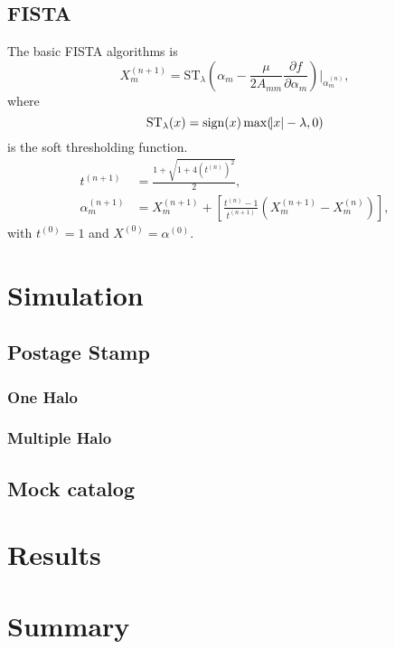 \documentclass[twocolumn]{aastex62}
\begin{document}
\subsection{FISTA}
The basic FISTA algorithms is
\begin{equation}
X^{(n+1)}_m=\mathrm{ST}_{\lambda} (\alpha_m -\frac{\mu}{2A_{mm}} \frac{\partial f}{\partial \alpha_m})|_{\alpha^{(n)}_m} ,
\end{equation}
where
\begin{equation}
\mathrm{ST}_{\lambda} (x) = \mathrm{sign} (x) \max (\abs{x}-\lambda,0)
\end{equation}
is the soft thresholding function.
\begin{equation}
\begin{split}
t^{(n+1)} &= \frac{1+\sqrt{1+4(t^{(n)})^2}}{2},\\
\alpha^{(n+1)}_m&=X^{(n+1)}_m+[\frac{t^{(n)}-1}{t^{(n+1)}}(X^{(n+1)}_m-X^{(n)}_m)],
\end{split}
\end{equation}
with $t^{(0)}=1$ and $X^{(0)}=\alpha^{(0)}$.

\section{Simulation}


\subsection{Postage Stamp}


\subsubsection{One Halo}
\label{subsubsec:oneHalo}


\subsubsection{Multiple Halo}
\label{subsubsec:multiHalo}


\subsection{Mock catalog}
\label{subsec:mockCat}


\section{Results}


\section{Summary}
\end{document}
